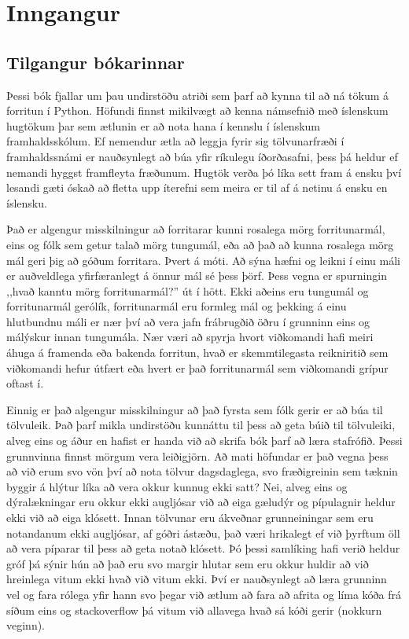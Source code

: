 
\chapter{Inngangur}

\section{Tilgangur bókarinnar}

Þessi bók fjallar um þau undirstöðu atriði sem þarf að kynna til að ná tökum á forritun í Python. 
Höfundi finnst mikilvægt að kenna námsefnið með íslenskum hugtökum þar sem ætlunin er að nota hana í kennslu í íslenskum framhaldsskólum. 
Ef nemendur ætla að leggja fyrir sig tölvunarfræði í framhaldssnámi er nauðsynlegt að búa yfir ríkulegu íðorðasafni, þess þá heldur ef nemandi hyggst framfleyta fræðunum. 
Hugtök verða þó líka sett fram á ensku því lesandi gæti óskað að fletta upp íterefni sem meira er til af á netinu á ensku en íslensku.

Það er algengur misskilningur að forritarar kunni rosalega mörg forritunarmál, eins og fólk sem getur talað mörg tungumál, eða að það að kunna rosalega mörg mál geri þig að góðum forritara.
Þvert á móti.
Að sýna hæfni og leikni í einu máli er auðveldlega yfirfæranlegt á önnur mál sé þess þörf.
Þess vegna er spurningin ,,hvað kanntu mörg forritunarmál?'' út í hött.
Ekki aðeins eru tungumál og forritunarmál gerólík, forritunarmál eru formleg mál og þekking á einu hlutbundnu máli er nær því að vera jafn frábrugðið öðru í grunninn eins og málýskur innan tungumála.
Nær væri að spyrja hvort viðkomandi hafi meiri áhuga á framenda eða bakenda forritun, hvað er skemmtilegasta reikniritið sem viðkomandi hefur útfært eða hvert er það forritunarmál sem viðkomandi grípur oftast í.

Einnig er það algengur misskilningur að það fyrsta sem fólk gerir er að búa til tölvuleik.
Það þarf mikla undirstöðu kunnáttu til þess að geta búið til tölvuleiki, alveg eins og áður en hafist er handa við að skrifa bók þarf að læra stafrófið.
Þessi grunnvinna finnst mörgum vera leiðigjörn.
Að mati höfundar er það vegna þess að við erum svo vön því að nota tölvur dagsdaglega, svo fræðigreinin sem tæknin byggir á hlýtur líka að vera okkur kunnug ekki satt?
Nei, alveg eins og dýralækningar eru okkur ekki augljósar við að eiga gæludýr og pípulagnir heldur ekki við að eiga klósett.
Innan tölvunar eru ákveðnar grunneiningar sem eru notandanum ekki augljósar, af góðri ástæðu, það væri hrikalegt ef við þyrftum öll að vera píparar til þess að geta notað klósett.
Þó þessi samlíking hafi verið heldur gróf þá sýnir hún að það eru svo margir hlutar sem eru okkur huldir að við hreinlega vitum ekki hvað við vitum ekki.
Því er nauðsynlegt að læra grunninn vel og fara rólega yfir hann svo þegar við ætlum að fara að afrita og líma kóða frá síðum eins og stackoverflow þá vitum við allavega hvað sá kóði gerir (nokkurn veginn).


